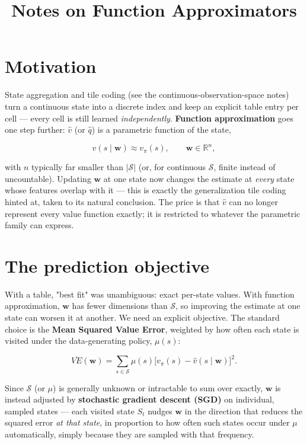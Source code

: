 \documentclass[11pt]{article}
\title{Notes on Function Approximators}
\author{}
\date{}
\begin{document}
\maketitle

\section{Motivation}

State aggregation and tile coding (see the continuous-observation-space
notes) turn a continuous state into a discrete index and keep an explicit
table entry per cell — every cell is still learned \emph{independently}.
\textbf{Function approximation} goes one step further: $\hat v$ (or
$\hat q$) is a parametric function of the state,

\[
    \hat v(s \mid \mathbf{w}) \approx v_\pi(s), \qquad \mathbf{w} \in \mathbb{R}^n,
\]

with $n$ typically far smaller than $|\mathcal{S}|$ (or, for continuous
$\mathcal{S}$, finite instead of uncountable). Updating $\mathbf{w}$ at one
state now changes the estimate at \emph{every} state whose features
overlap with it — this is exactly the generalization tile coding hinted
at, taken to its natural conclusion. The price is that $\hat v$ can no
longer represent every value function exactly; it is restricted to
whatever the parametric family can express.

\section{The prediction objective}

With a table, "best fit" was unambiguous: exact per-state values.
With function approximation, $\mathbf{w}$ has fewer dimensions than
$\mathcal{S}$, so improving the estimate at one state can worsen it at
another. We need an explicit objective. The standard choice is the
\textbf{Mean Squared Value Error}, weighted by how often each state is
visited under the data-generating policy, $\mu(s)$:

\[
    \overline{VE}(\mathbf{w}) = \sum_{s \in \mathcal{S}} \mu(s) \Big[ v_\pi(s) - \hat v(s \mid \mathbf{w}) \Big]^2.
\]

Since $\mathcal{S}$ (or $\mu$) is generally unknown or intractable to sum
over exactly, $\mathbf{w}$ is instead adjusted by \textbf{stochastic
gradient descent (SGD)} on individual, sampled states — each visited state
$S_t$ nudges $\mathbf{w}$ in the direction that reduces the squared error
\emph{at that state}, in proportion to how often such states occur under
$\mu$ automatically, simply because they are sampled with that frequency.
\end{document}

